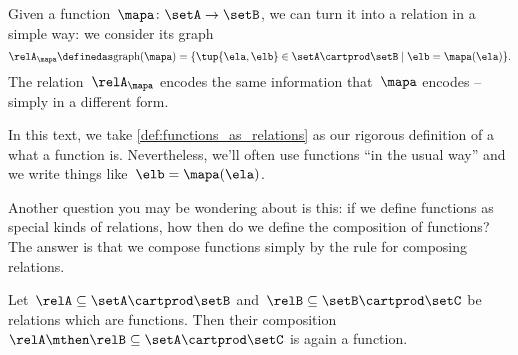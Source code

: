 Given a function~$\mapa \colon \setA \to \setB$, we can turn it into a relation in a simple way: we consider its graph
\begin{equation*}
    \relA_\mapa \definedas \text{graph}(\mapa) = \{ \tup{\ela,\elb} \in \setA \cartprod \setB \mid \elb= \mapa(\ela) \}.
\end{equation*}
The relation~$\relA_\mapa$ encodes the same information that~$\mapa$ encodes -- simply in a different form.

In this text, we take \cref{def:functions_as_relations} as our rigorous definition of a what a function is.
Nevertheless, we'll often use functions ``in the usual way'' and we write things like~$\elb = \mapa(\ela)$.

Another question you may be wondering about is this: if we define functions as special kinds of relations, how then do we define the composition of functions?
The answer is that we compose functions simply by the rule for composing relations.

\begin{lemma}
    \label{lem:comprelfun}
    Let~$\relA \subseteq \setA \cartprod \setB$ and~$\relB \subseteq \setB \cartprod \setC$ be relations which are functions.
    Then their composition~$\relA \mthen \relB \subseteq \setA \cartprod \setC$ is again a function.
\end{lemma}

